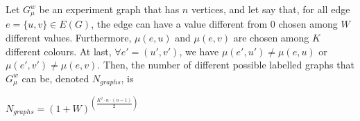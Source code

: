 \begin{observation}
    \label{obs:possible_graphs}
    Let $G_\mu^w$ be an experiment graph that has $n$ vertices, and let say that, for all edge $e = \{u, v\} \in E(G)$, the edge can have a value different from $0$ chosen among $W$ different values.
    Furthermore, $\mu(e, u)$ and $\mu(e, v)$ are chosen among $K$ different colours.
    At last, $\forall e' = (u', v')$, we have $\mu(e', u') \neq \mu(e, u)$ or $\mu(e', v') \neq \mu(e, v)$.
    Then, the number of different possible labelled graphs that $G_\mu^w$ can be, denoted $N_{graphs}$, is

    \begin{center}
        $N_{graphs} = (1 + W)^{\left(\frac{K^2 \cdot n \cdot (n-1)}{2}\right)}$
    \end{center}
\end{observation}


